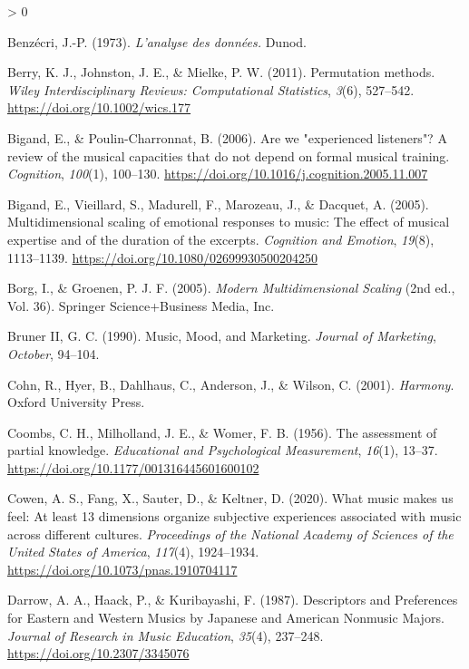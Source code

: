 \documentclass[
  english,
  man,floatsintext]{apa6}
\newlength{\cslhangindent}
\newenvironment{CSLReferences}[2] %
 {%
  \setlength{\parindent}{0pt}
  \ifodd #1 \everypar{\setlength{\hangindent}{\cslhangindent}}\ignorespaces\fi
  \ifnum #2 > 0
  \setlength{\parskip}{#2\baselineskip}
  \fi
 }%
 {}
\begin{document}
\begin{CSLReferences}{1}{0}
\leavevmode\hypertarget{ref-Benzecri1973}{}%
Benzécri, J.-P. (1973). \emph{{L'analyse des données.}} Dunod.

\leavevmode\hypertarget{ref-Berry2011}{}%
Berry, K. J., Johnston, J. E., \& Mielke, P. W. (2011). {Permutation methods}. \emph{Wiley Interdisciplinary Reviews: Computational Statistics}, \emph{3}(6), 527--542. \url{https://doi.org/10.1002/wics.177}

\leavevmode\hypertarget{ref-Bigand2006}{}%
Bigand, E., \& Poulin-Charronnat, B. (2006). {Are we "experienced listeners"? A review of the musical capacities that do not depend on formal musical training}. \emph{Cognition}, \emph{100}(1), 100--130. \url{https://doi.org/10.1016/j.cognition.2005.11.007}

\leavevmode\hypertarget{ref-Bigand2005}{}%
Bigand, E., Vieillard, S., Madurell, F., Marozeau, J., \& Dacquet, A. (2005). {Multidimensional scaling of emotional responses to music: The effect of musical expertise and of the duration of the excerpts}. \emph{Cognition and Emotion}, \emph{19}(8), 1113--1139. \url{https://doi.org/10.1080/02699930500204250}

\leavevmode\hypertarget{ref-Borg2005}{}%
Borg, I., \& Groenen, P. J. F. (2005). \emph{{Modern Multidimensional Scaling}} (2nd ed., Vol. 36). Springer Science+Business Media, Inc.

\leavevmode\hypertarget{ref-BrunerII1990}{}%
Bruner II, G. C. (1990). {Music, Mood, and Marketing}. \emph{Journal of Marketing}, \emph{October}, 94--104.

\leavevmode\hypertarget{ref-Cohn2001}{}%
Cohn, R., Hyer, B., Dahlhaus, C., Anderson, J., \& Wilson, C. (2001). \emph{{Harmony}}. Oxford University Press.

\leavevmode\hypertarget{ref-Coombs1956}{}%
Coombs, C. H., Milholland, J. E., \& Womer, F. B. (1956). {The assessment of partial knowledge}. \emph{Educational and Psychological Measurement}, \emph{16}(1), 13--37. \url{https://doi.org/10.1177/001316445601600102}

\leavevmode\hypertarget{ref-Cowen2020}{}%
Cowen, A. S., Fang, X., Sauter, D., \& Keltner, D. (2020). {What music makes us feel: At least 13 dimensions organize subjective experiences associated with music across different cultures}. \emph{Proceedings of the National Academy of Sciences of the United States of America}, \emph{117}(4), 1924--1934. \url{https://doi.org/10.1073/pnas.1910704117}

\leavevmode\hypertarget{ref-Darrow1987}{}%
Darrow, A. A., Haack, P., \& Kuribayashi, F. (1987). {Descriptors and Preferences for Eastern and Western Musics by Japanese and American Nonmusic Majors}. \emph{Journal of Research in Music Education}, \emph{35}(4), 237--248. \url{https://doi.org/10.2307/3345076}


\end{CSLReferences}
\end{document}
